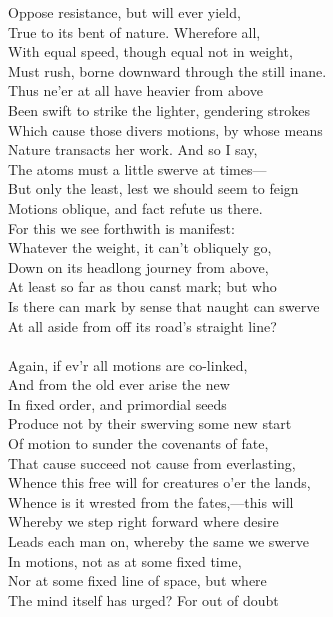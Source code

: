 Oppose resistance, but will ever yield,\\
True to its bent of nature. Wherefore all,\\
With equal speed, though equal not in weight,\\
Must rush, borne downward through the still inane.\\
Thus ne'er at all have heavier from above\\
Been swift to strike the lighter, gendering strokes\\
Which cause those divers motions, by whose means\\
Nature transacts her work. And so I say,\\
The atoms must a little swerve at times—\\
But only the least, lest we should seem to feign\\
Motions oblique, and fact refute us there.\\
For this we see forthwith is manifest:\\
Whatever the weight, it can't obliquely go,\\
Down on its headlong journey from above,\\
At least so far as thou canst mark; but who\\
Is there can mark by sense that naught can swerve\\
At all aside from off its road's straight line?\\
\\
Again, if ev'r all motions are co-linked,\\
And from the old ever arise the new\\
In fixed order, and primordial seeds\\
Produce not by their swerving some new start\\
Of motion to sunder the covenants of fate,\\
That cause succeed not cause from everlasting,\\
Whence this free will for creatures o'er the lands,\\
Whence is it wrested from the fates,—this will\\
Whereby we step right forward where desire\\
Leads each man on, whereby the same we swerve\\
In motions, not as at some fixed time,\\
Nor at some fixed line of space, but where\\
The mind itself has urged? For out of doubt\\
